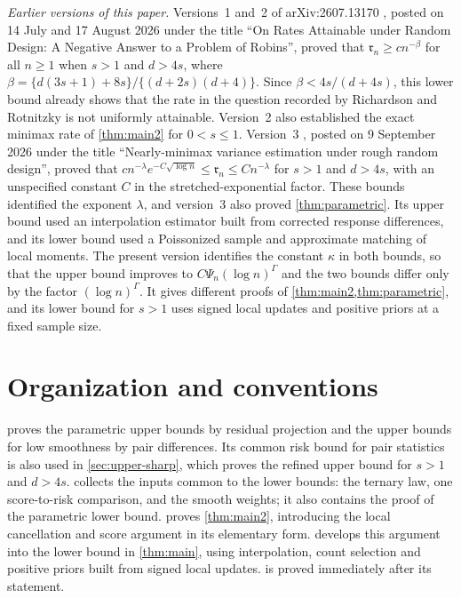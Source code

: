 \emph{Earlier versions of this paper.} Versions~1 and~2 of
arXiv:2607.13170 \cite{AronowLopatto2026v1,AronowLopatto2026v2}, posted
on 14 July and 17 August 2026 under the title ``On Rates Attainable
under Random Design: A Negative Answer to a Problem of Robins'', proved
that $\mathfrak r_n\ge cn^{-\beta}$ for all $n\ge1$ when $s>1$ and
$d>4s$, where $\beta=\{d(3s+1)+8s\}/\{(d+2s)(d+4)\}$. Since
$\beta<4s/(d+4s)$, this lower bound already shows that the rate in the
question recorded by Richardson and Rotnitzky is not uniformly
attainable. Version~2 also established the exact minimax rate of
\cref{thm:main2} for $0<s\le1$. Version~3 \cite{AronowLopatto2026v3},
posted on 9 September 2026 under the title ``Nearly-minimax variance
estimation under rough random design'', proved that
$cn^{-\lambda}e^{-C\sqrt{\log n}}\le\mathfrak r_n\le Cn^{-\lambda}$ for
$s>1$ and $d>4s$, with an unspecified constant $C$ in the
stretched-exponential factor. These bounds identified the exponent
$\lambda$, and version~3 also proved \cref{thm:parametric}. Its upper bound
used an interpolation estimator built from corrected response
differences, and its lower bound used a Poissonized sample and
approximate matching of local moments. The present version identifies the
constant $\kappa$ in both bounds, so that the upper bound improves to
$C\Psi_n(\log n)^\Gamma$ and the two bounds differ only by the factor
$(\log n)^\Gamma$. It gives different proofs of
\cref{thm:main2,thm:parametric}, and its lower bound for $s>1$ uses signed local
updates and positive priors at a fixed sample size.

\section{Organization and conventions}\label{sec:intro-organization}
 proves the parametric upper bounds by residual
projection and the upper bounds for low smoothness by pair
differences. Its common risk bound for pair statistics is also used in
\cref{sec:upper-sharp},
which proves the refined upper bound for $s>1$ and $d>4s$.
 collects the inputs common to the lower bounds:
the ternary law, one score-to-risk comparison, and the smooth
weights; it also contains the proof of the parametric lower bound.
 proves \cref{thm:main2}, introducing the local
cancellation and score argument in its elementary form. 
develops this argument into the lower bound in \cref{thm:main}, using
interpolation, count selection and positive priors built from signed
local updates.  is proved immediately after its
statement.

